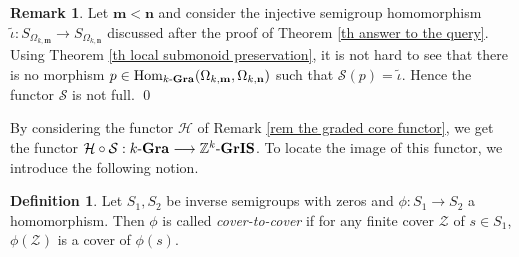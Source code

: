 \documentclass[a4paper,reqno,11pt]{amsart}
\numberwithin{equation}{section}
\theoremstyle{definition}
\newtheorem{dfn}[thm]{Definition}
\newtheorem{rmk}[thm]{Remark}
\theoremstyle{remark}
\newcommand{\Hom}{\operatorname{Hom}}
\newcommand{\N}{\mathbf{n}}
\newcommand{\M}{\mathbf{m}}
\begin{document}
\begin{rmk}\label{rem the functor S is not full}
Let $\M<\N$ and consider the injective semigroup homomorphism $\tilde{\iota}:S_{\Omega_{k,\M}}\longrightarrow S_{\Omega_{k,\N}}$ discussed after the proof of Theorem \ref{th answer to the query}. Using Theorem \ref{th local submonoid preservation}, it is not hard to see that there is no morphism $p\in \Hom_{k\textup{-\textbf{Gra}}}(\Omega_{k,\M},\Omega_{k,\N})$ such that $\mathcal{S}(p)=\tilde{\iota}$. Hence the functor $\mathcal{S}$ is not full. \qed
\end{rmk}
By considering the functor $\mathcal{H}$ of Remark \ref{rem the graded core functor}, we get the functor $\mathcal{H}\circ \mathcal{S}:k\textup{-\textbf{Gra}}\longrightarrow \mathbb{Z}^k\textup{-\textbf{GrIS}}$. To locate the image of this functor, we introduce the following notion. 
\begin{dfn}\label{def cover preserving}
Let $S_1,S_2$ be inverse semigroups with zeros and $\phi:S_1\longrightarrow S_2$ a homomorphism. Then $\phi$ is called \emph{cover-to-cover} if for any finite cover $\mathcal{Z}$ of $s\in S_1$, $\phi(\mathcal{Z})$ is a cover of $\phi(s)$.  
\end{dfn}
\end{document}
